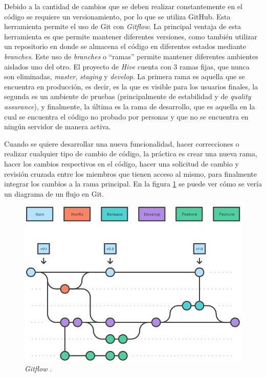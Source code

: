     Debido a la cantidad de cambios que se deben realizar constantemente en el código se requiere un versionamiento, por lo que se utiliza GitHub. Esta herramienta permite el uso de Git con \textit{Gitflow}. La principal ventaja de esta herramienta es que permite mantener diferentes versiones, como también utilizar un repositorio en donde se almacena el código en diferentes estados mediante \textit{branches}. Este uso de \textit{branches} o ``ramas'' permite mantener diferentes ambientes aislados uno del otro. El proyecto de \textit{Hive} cuenta con 3 ramas fijas, que nunca son eliminadas, \textit{master}, \textit{staging} y \textit{develop}. La primera rama es aquella que se encuentra en producción, es decir, es la que es visible para los usuarios finales, la segunda es un ambiente de pruebas (principalmente de estabilidad y de \textit{quality assurance}), y finalmente, la última es la rama de desarrollo, que es aquella en la cual se encuentra el código no probado por personas y que no se encuentra en ningún servidor de manera activa. 
    
    Cuando se quiere desarrollar una nueva funcionalidad, hacer correcciones o realizar cualquier tipo de cambio de código, la práctica es crear una nueva rama, hacer los cambios respectivos en el código, hacer una solicitud de cambio y revisión cruzada entre los miembros que tienen acceso al mismo, para finalmente integrar los cambios a la rama principal. En la figura \ref{fig:gitflow_diagram} se puede ver cómo se vería un diagrama de un flujo en Git.
    
    \begin{figure}
        \centering
        \includegraphics[width=0.65\linewidth]{figures/gitflow.png}
        \caption{\textit{Gitflow} \protect\cite{gitflow_diagram}.}
        \label{fig:gitflow_diagram}
    \end{figure}
    
